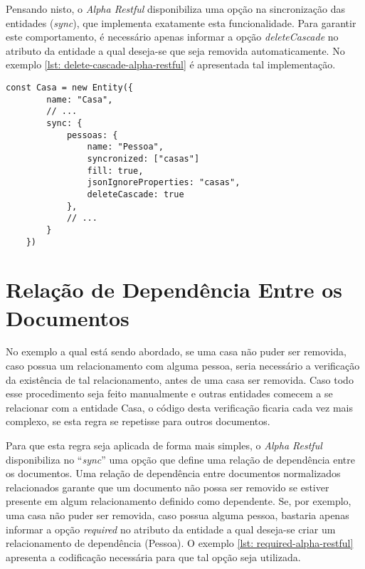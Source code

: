 Pensando nisto, o \textit{Alpha Restful} disponibiliza uma opção na sincronização das entidades (\textit{sync}), que implementa exatamente esta funcionalidade. Para garantir este comportamento, é necessário apenas informar a opção \textit{deleteCascade} no atributo da entidade a qual deseja-se que seja removida automaticamente. No exemplo \ref{lst: delete-cascade-alpha-restful} é apresentada tal implementação.

\begin{lstlisting}[style=ES6, caption={Modelagem de ``Casa'' com \textit{deleteCascade}\label{lst: delete-cascade-alpha-restful}}]
    const Casa = new Entity({
        name: "Casa",
        // ...
        sync: {
            pessoas: {
                name: "Pessoa",
                syncronized: ["casas"]
                fill: true,
                jsonIgnoreProperties: "casas",
                deleteCascade: true
            },
            // ...
        }
    })
\end{lstlisting}

\section{Relação de Dependência Entre os Documentos\label{section: relacao-dependencia-entre-documentos}}

No exemplo a qual está sendo abordado, se uma casa não puder ser removida, caso possua um relacionamento com alguma pessoa, seria necessário a verificação da existência de tal relacionamento, antes de uma casa ser removida. Caso todo esse procedimento seja feito manualmente e outras entidades comecem a se relacionar com a entidade Casa, o código desta verificação ficaria cada vez mais complexo, se esta regra se repetisse para outros documentos.

Para que esta regra seja aplicada de forma mais simples, o \textit{Alpha Restful} disponibiliza no ``\textit{sync}'' uma opção que define uma relação de dependência entre os documentos. Uma relação de dependência entre documentos normalizados relacionados garante que um documento não possa ser removido se estiver presente em algum relacionamento definido como dependente. Se, por exemplo, uma casa não puder ser removida, caso possua alguma pessoa, bastaria apenas informar a opção \textit{required} no atributo da entidade a qual deseja-se criar um relacionamento de dependência (Pessoa). O exemplo \ref{lst: required-alpha-restful} apresenta a codificação necessária para que tal opção seja utilizada.

